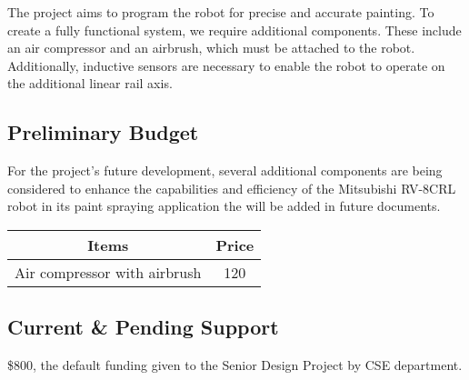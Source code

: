 The project aims to program the robot for precise and accurate painting. To create a fully functional system, we require additional components. These include an air compressor and an airbrush, which must be attached to the robot. Additionally, inductive sensors are necessary to enable the robot to operate on the additional linear rail axis.


\subsection{Preliminary Budget}

For the project's future development, several additional components are being considered to enhance the capabilities and efficiency of the Mitsubishi RV-8CRL robot in its paint spraying application the will be added in future documents.

\begin{table}[h]
    \centering
    \begin{tabular}{|c|c|} \hline 
         Items& Price\\ \hline 
         Air compressor with airbrush& 120\\ \hline
    \end{tabular}
\end{table}


\subsection{Current \& Pending Support}

\$800, the default funding given to  the Senior Design Project by CSE department.